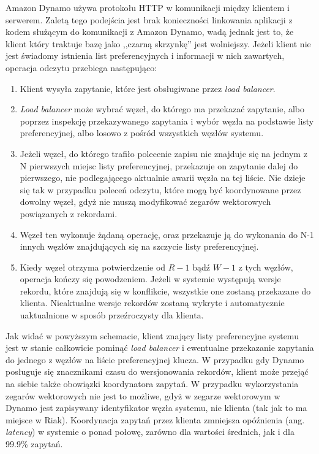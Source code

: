 Amazon Dynamo używa protokołu HTTP w komunikacji między klientem i serwerem.
Zaletą tego podejścia jest brak konieczności linkowania aplikacji z kodem służącym do komunikacji z Amazon Dynamo, wadą jednak jest to, że klient który traktuje bazę jako ,,czarną skrzynkę'' jest wolniejszy.
Jeżeli klient nie jest świadomy istnienia list preferencyjnych i informacji w nich zawartych, operacja odczytu przebiega następująco: 
\begin{enumerate}
 \item Klient wysyła zapytanie, które jest obsługiwane przez \emph{load balancer}.
 \item \emph{Load balancer} może wybrać węzeł, do którego ma przekazać zapytanie, albo poprzez inspekcję przekazywanego zapytania i wybór węzła na podstawie listy preferencyjnej, albo losowo z pośród wszystkich węzłów systemu.
 \item Jeżeli węzeł, do którego trafiło polecenie zapisu nie znajduje się na jednym z N pierwszych miejsc listy preferencyjnej, przekazuje on zapytanie dalej do pierwszego, nie podlegającego aktualnie awarii węzła na tej liście.
 Nie dzieje się tak w przypadku poleceń odczytu, które mogą być koordynowane przez dowolny węzeł, gdyż nie muszą modyfikować zegarów wektorowych powiązanych z rekordami.
 \item Węzeł ten wykonuje żądaną operację, oraz przekazuje ją do wykonania do N-1 innych węzłów znajdujących się na szczycie listy preferencyjnej.
 \item Kiedy węzeł otrzyma potwierdzenie od $R-1$ bądź $W-1$ z tych węzłów, operacja kończy się powodzeniem.
 Jeżeli w systemie występują wersje rekordu, które znajdują się w konflikcie, wszystkie one zostaną przekazane do klienta.
 Nieaktualne wersje rekordów zostaną wykryte i automatycznie uaktualnione w sposób przeźroczysty dla klienta.
\end{enumerate}

Jak widać w powyższym schemacie, klient znający listy preferencyjne systemu jest w stanie całkowicie pominąć \emph{load balancer} i ewentualne przekazanie zapytania do jednego z węzłów na liście preferencyjnej klucza. 
W przypadku gdy Dynamo posługuje się znacznikami czasu do wersjonowania rekordów, klient może przejąć na siebie także obowiązki koordynatora zapytań.
W przypadku wykorzystania zegarów wektorowych nie jest to możliwe, gdyż w zegarze wektorowym w Dynamo jest zapisywany identyfikator węzła systemu, nie klienta (tak jak to ma miejsce w Riak).
Koordynacja zapytań przez klienta zmniejsza opóźnienia (ang. \emph{latency}) w systemie o ponad połowę, zarówno dla wartości średnich, jak i dla 99.9\% zapytań.

